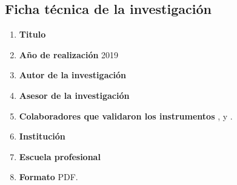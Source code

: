 \documentclass[12pt,a4paper]{article}
\begin{document}
\subsection{Ficha técnica de la investigación \label{ficha tecnica}}
\begin{enumerate}
	\item \textbf{Titulo }\titulo\textbf{ }
	\item \textbf{Año de realización }2019
	\item \textbf{Autor de la investigación }\autor
	\item \textbf{Asesor de la investigación }\asesor   
	\item \textbf{Colaboradores que validaron los instrumentos }\asesor, \expert y \expertt.
	\item \textbf{Institución } \lugar
	\item \textbf{Escuela profesional }\lugar
	\item \textbf{Formato }PDF.\textbf{ }
	

\end{enumerate}
\end{document}
